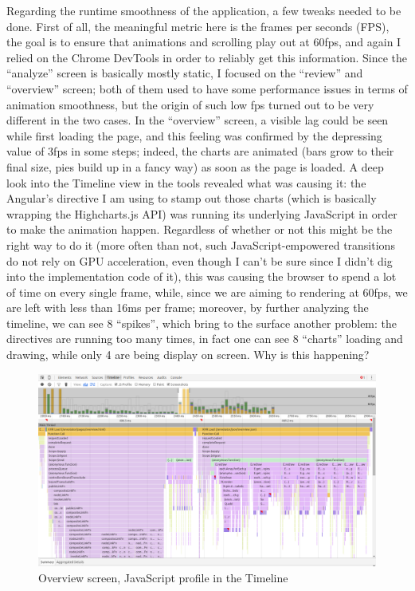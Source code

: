 \documentclass[12pt,svgnames]{memoir}
\begin{document}
Regarding the runtime smoothness of the application, a few tweaks needed
to be done. First of all, the meaningful metric here is the frames per
seconds (FPS), the goal is to ensure that animations and scrolling play
out at 60fps, and again I relied on the Chrome DevTools in order to
reliably get this information. Since the ``analyze'' screen is basically
mostly static, I focused on the ``review'' and ``overview'' screen; both
of them used to have some performance issues in terms of animation
smoothness, but the origin of such low fps turned out to be very
different in the two cases. In the ``overview'' screen, a visible lag
could be seen while first loading the page, and this feeling was
confirmed by the depressing value of 3fps in some steps; indeed, the
charts are animated (bars grow to their final size, pies build up in a
fancy way) as soon as the page is loaded. A deep look into the Timeline
view in the tools revealed what was causing it: the Angular's directive
I am using to stamp out those charts (which is basically wrapping the
Highcharts.js API) was running its underlying JavaScript in order to
make the animation happen. Regardless of whether or not this might be
the right way to do it (more often than not, such JavaScript-empowered
transitions do not rely on GPU acceleration, even though I can't be sure
since I didn't dig into the implementation code of it), this was causing
the browser to spend a lot of time on every single frame, while, since
we are aiming to rendering at 60fps, we are left with less than 16ms per
frame; moreover, by further analyzing the timeline, we can see 8
``spikes'', which bring to the surface another problem: the directives
are running too many times, in fact one can see 8 ``charts'' loading and
drawing, while only 4 are being display on screen. Why is this
happening?

\begin{figure}[htbp]
\centering
\includegraphics{./src/img/overview-jsprofile.png}
\caption{Overview screen, JavaScript profile in the Timeline}
\end{figure}
\end{document}

